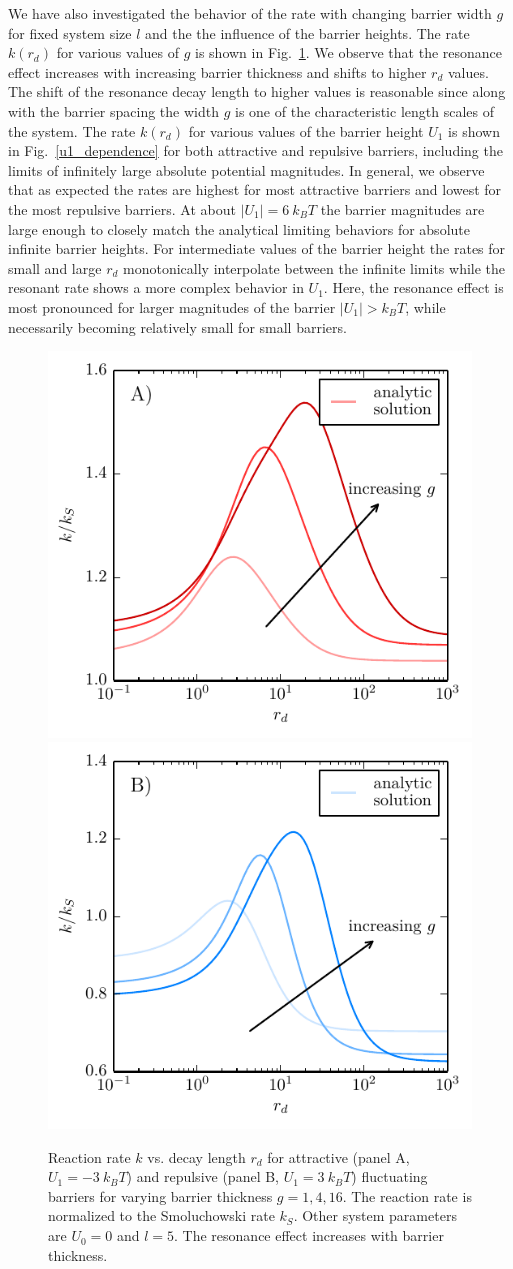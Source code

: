 \documentclass[preprint,superscriptaddress]{revtex4-1}
\begin{document}
We have also investigated the behavior of the rate with changing barrier width $g$ for fixed system size $l$ and the the 
influence of the barrier heights. The rate $k(r_d)$ for various values of $g$ is shown in Fig.~\ref{fig:var_g}. We observe that 
the resonance effect increases with increasing barrier thickness and shifts to higher $r_d$ values. The shift of the resonance decay 
length to higher values is  reasonable since along with the barrier spacing the width $g$ is one of the characteristic length 
scales of the system.  The rate $k(r_d)$ for various values of the barrier height $U_1$ is shown in Fig.~\ref{u1_dependence} for both 
attractive and repulsive barriers, including the limits of infinitely large absolute potential magnitudes.
 In general, we observe that as expected the rates are highest for most attractive barriers and lowest for the most repulsive
 barriers. At about $|U_1| = 6~k_BT$ the barrier magnitudes are large enough to closely match the analytical limiting behaviors
 for absolute infinite barrier heights. For intermediate values of the barrier height the rates for small and large $r_d$ monotonically interpolate
 between the infinite limits while the resonant rate shows a more complex behavior in $U_1$. Here, the resonance effect is most pronounced
 for larger magnitudes of the barrier $|U_1|>k_BT$, while necessarily becoming relatively small for small barriers. 


\begin{figure}[H]
\begin{center}
\includegraphics[width= .4 \textwidth]{plots/g2_ab_rates.pdf}
\includegraphics[width= .4 \textwidth]{plots/g2_rb_rates.pdf}
\caption{Reaction rate $k$ vs. decay length $r_d$ for attractive (panel A,  $U_1 = -3 ~k_BT$) and repulsive (panel B, $U_1 = 3 ~k_BT$) fluctuating barriers 
for varying barrier thickness $g = 1, 4, 16$. The reaction rate is normalized to the Smoluchowski rate $k_S$. 
Other system parameters are $U_0= 0$ and $l = 5$.  The resonance effect increases with barrier thickness.}
\label{fig:var_g}
\end{center}
\end{figure}
\end{document}

